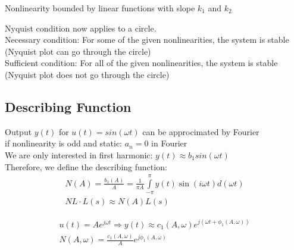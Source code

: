 \begin{minipage}{0.39\linewidth}
    Nonlinearity bounded by linear functions with slope $k_1$ and $k_2$
\end{minipage}

Nyquist condition now applies to a circle.\\
Necessary condition: For some of the given nonlinearities, the system is stable (Nyquist plot can go through the circle)\\
Sufficient condition: For all of the given nonlinearities, the system is stable (Nyquist plot does not go through the circle)

\subsection{Describing Function}
    Output $y(t)$ for $u(t) = sin(\omega t)$ can be approcimated by Fourier\\
    if nonlinearity is odd and static: $a_n = 0$ in Fourier\\
    We are only interested in first harmonic: $y(t) \approx b_1 sin(\omega t)$\\
    Therefore, we define the describing function:
    \begin{align*}
        N(A) = \frac{b_1(A)}{A} = \frac{1}{\pi A} \int\limits_{-\pi}^{\pi} y(t) \sin(i \omega t) d(\omega t)\\
        NL \cdot L(s) \approx N(A) L(s)
    \end{align*}

    \begin{align*}
        u(t) = Ae^{j \omega t} \Rightarrow
        y(t) \approx c_1(A, \omega) e^{j(\omega t + \phi_1(A, \omega))}\\
        N(A, \omega) = \frac{c_1(A, \omega)}{A} e^{j \phi_1(A, \omega)}
    \end{align*}

